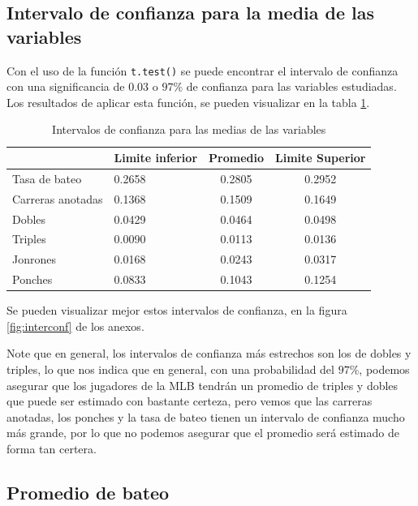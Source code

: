 \documentclass{staprojteamusb}
\begin{document}
 \hypertarget{intervalo-de-confianza-para-la-media-de-las-variables}{%
 \subsection{Intervalo de confianza para la media de las variables}\label{intervalo-de-confianza-para-la-media-de-las-variables}}

 Con el uso de la función \texttt{t.test()} se puede encontrar el intervalo de confianza con una significancia de \(0.03\) o \(97\%\) de confianza para las variables estudiadas. Los resultados de aplicar esta función, se pueden visualizar en la tabla \ref{tab:intervals}.

 \begin{table}[h]

 
 \centering
 \begin{tabular}[t]{l|l|c|c}
 \hline
   & Limite inferior & Promedio & Limite Superior\\
 \hline
 Tasa de bateo & 0.2658 & 0.2805 & 0.2952\\
 \hline
 Carreras anotadas & 0.1368 & 0.1509 & 0.1649\\
 \hline
 Dobles & 0.0429 & 0.0464 & 0.0498\\
 \hline
 Triples & 0.0090 & 0.0113 & 0.0136\\
 \hline
 Jonrones & 0.0168 & 0.0243 & 0.0317\\
 \hline
 Ponches & 0.0833 & 0.1043 & 0.1254\\
 \hline
 \end{tabular}
 \caption{\label{tab:intervals}Intervalos de confianza para las medias de las variables}
 \end{table}

 Se pueden visualizar mejor estos intervalos de confianza, en la figura \ref{fig:interconf} de los anexos.

 Note que en general, los intervalos de confianza más estrechos son los de dobles y triples, lo que nos indica que en general, con una probabilidad del \(97\%\), podemos asegurar que los jugadores de la MLB tendrán un promedio de triples y dobles que puede ser estimado con bastante certeza, pero vemos que las carreras anotadas, los ponches y la tasa de bateo tienen un intervalo de confianza mucho más grande, por lo que no podemos asegurar que el promedio será estimado de forma tan certera.

 \hypertarget{promedio-de-bateo}{%
 \subsection{Promedio de bateo}\label{promedio-de-bateo}}
\end{document}

